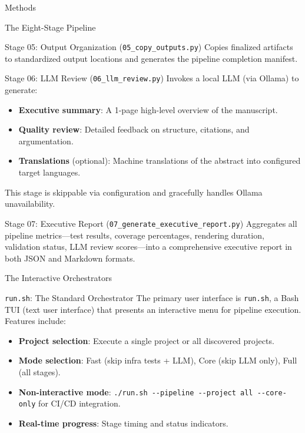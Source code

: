 \documentclass[
  ignorenonframetext,
]{beamer}
\providecommand{\tightlist}{%
  \setlength{\itemsep}{0pt}\setlength{\parskip}{0pt}}
\begin{document}
\begin{frame}[fragile]{Methods}
\begin{block}{The Eight-Stage Pipeline}
\begin{block}{Stage 05: Output Organization
(\texttt{05\_copy\_outputs.py})}
\protect{}\label{stage-05-output-organization-05_copy_outputs.py}
Copies finalized artifacts to standardized output locations and
generates the pipeline completion manifest.
\end{block}

\begin{block}{Stage 06: LLM Review (\texttt{06\_llm\_review.py})}
\protect{}\label{stage-06-llm-review-06_llm_review.py}
Invokes a local LLM (via Ollama) to generate:

\begin{itemize}
\tightlist
\item
  \textbf{Executive summary}: A 1-page high-level overview of the
  manuscript.
\item
  \textbf{Quality review}: Detailed feedback on structure, citations,
  and argumentation.
\item
  \textbf{Translations} (optional): Machine translations of the abstract
  into configured target languages.
\end{itemize}

This stage is skippable via configuration and gracefully handles Ollama
unavailability.
\end{block}

\begin{block}{Stage 07: Executive Report
(\texttt{07\_generate\_executive\_report.py})}
\protect{}\label{stage-07-executive-report-07_generate_executive_report.py}
Aggregates all pipeline metrics---test results, coverage percentages,
rendering duration, validation status, LLM review scores---into a
comprehensive executive report in both JSON and Markdown formats.
\end{block}
\end{block}

\begin{block}{The Interactive Orchestrators}
\protect{}\label{the-interactive-orchestrators}
\begin{block}{\texttt{run.sh}: The Standard Orchestrator}
\protect{}\label{run.sh-the-standard-orchestrator}
The primary user interface is \texttt{run.sh}, a Bash TUI (text user
interface) that presents an interactive menu for pipeline execution.
Features include:

\begin{itemize}
\tightlist
\item
  \textbf{Project selection}: Execute a single project or all discovered
  projects.
\item
  \textbf{Mode selection}: Fast (skip infra tests + LLM), Core (skip LLM
  only), Full (all stages).
\item
  \textbf{Non-interactive mode}:
  \texttt{./run.sh\ -\/-pipeline\ -\/-project\ all\ -\/-core-only} for
  CI/CD integration.
\item
  \textbf{Real-time progress}: Stage timing and status indicators.
\end{itemize}
\end{block}


\end{block}
\end{frame}
\end{document}
